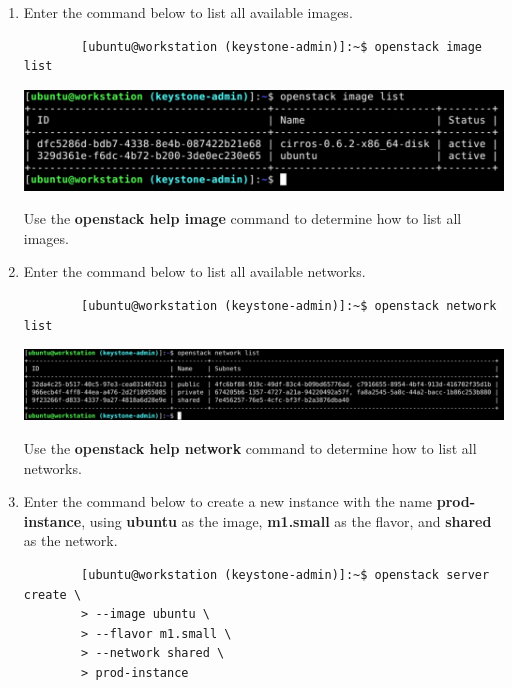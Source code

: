 \documentclass[letterpaper, 12pt]{article}
\begin{document}
\begin{enumerate}
    \item Enter the command below to list all available images.
    \begin{lstlisting}
        [ubuntu@workstation (keystone-admin)]:~$ openstack image list
    \end{lstlisting}

    \begin{center}
        \includegraphics[width=\linewidth]{images/part2/step11.png}
    \end{center}

    \begin{tipbox}
        Use the \textbf{openstack help image} command to determine how to list all images.
    \end{tipbox}

    \item Enter the command below to list all available networks.
    \begin{lstlisting}
        [ubuntu@workstation (keystone-admin)]:~$ openstack network list
    \end{lstlisting}

    \begin{center}
        \includegraphics[width=\linewidth]{images/part2/step12.png}
    \end{center}

    \begin{tipbox}
        Use the \textbf{openstack help network} command to determine how to list all networks.
    \end{tipbox}

    \item Enter the command below to create a new instance with the name \textbf{prod-instance}, using
    \textbf{ubuntu} as the image, \textbf{m1.small} as the flavor, and \textbf{shared} as the network.
    \begin{lstlisting}
        [ubuntu@workstation (keystone-admin)]:~$ openstack server create \
        > --image ubuntu \
        > --flavor m1.small \
        > --network shared \
        > prod-instance
    \end{lstlisting}


\end{enumerate}
\end{document}
